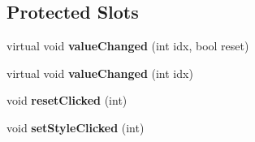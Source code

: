 \subsection*{Protected Slots}
\begin{DoxyCompactItemize}
\item 
\mbox{\label{class_ms_1_1_inspector_base_af3a6545a1f38e15c08e999b88f04b60b}} 
virtual void {\bfseries value\+Changed} (int idx, bool reset)
\item 
\mbox{\label{class_ms_1_1_inspector_base_ae8e5eb3420f9b873704ecca34f86cd9f}} 
virtual void {\bfseries value\+Changed} (int idx)
\item 
\mbox{\label{class_ms_1_1_inspector_base_ac3f125dfeec3da7a2352dd6a5f68ac88}} 
void {\bfseries reset\+Clicked} (int)
\item 
\mbox{\label{class_ms_1_1_inspector_base_a0fe0d0a189ab91c4eefd3990af859942}} 
void {\bfseries set\+Style\+Clicked} (int)
\end{DoxyCompactItemize}
